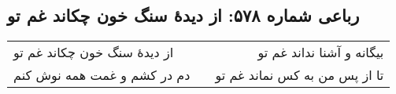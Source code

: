 \begin{center}
\section*{رباعی شماره ۵۷۸: از دیدهٔ سنگ خون چکاند غم تو}
\label{sec:sh578}
\begin{longtable}{l p{0.5cm} r}
از دیدهٔ سنگ خون چکاند غم تو
&&
بیگانه و آشنا نداند غم تو
\\
دم در کشم و غمت همه نوش کنم
&&
تا از پس من به کس نماند غم تو
\\
\end{longtable}
\end{center}
